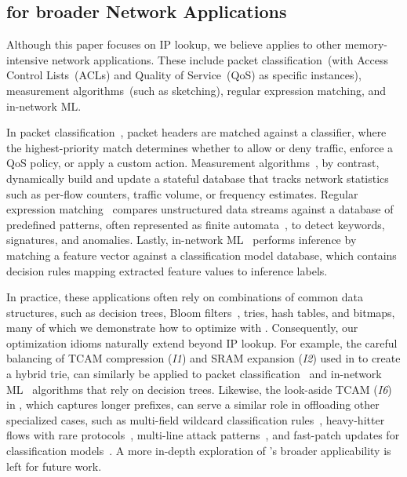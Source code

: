 \subsection{\cram for broader Network Applications}\label{subsec:other_applications}

Although this paper focuses on IP lookup, we believe \cram applies to other memory-intensive network applications. These include packet classification~(with Access Control Lists~(ACLs) and Quality of Service~(QoS) as specific instances), measurement algorithms~(such as sketching), regular expression matching, and in-network ML.


In packet classification~\cite{pkt_class_surv1, pkt_class_surv2, pkt_class_surv3}, packet headers are matched against a classifier, where the highest-priority match determines whether to allow or deny traffic, enforce a QoS policy, or apply a custom action. Measurement algorithms~\cite{opensketch, hashpipe, count_min_sketch, sketch_sampling}, by contrast, dynamically build and update a stateful database that tracks network statistics such as per-flow counters, traffic volume, or frequency estimates. Regular expression matching~\cite{insomnia, estan, hyperscan} compares unstructured data streams against a database of predefined patterns, often represented as finite automata~\cite{p4dfa}, to detect keywords, signatures, and anomalies. Lastly, in-network ML~\cite{homunculus, planter, inml_survey} performs inference by matching a feature vector against a classification model database, which contains decision rules mapping extracted feature values to inference labels.

In practice, these applications often rely on combinations of common data structures, such as decision trees, Bloom filters~\cite{bloom_filters}, tries, hash tables, and bitmaps, many of which we demonstrate how to optimize with \cram. Consequently, our optimization idioms naturally extend beyond IP lookup. For example, the careful balancing of TCAM compression ({\em I1}) and SRAM expansion ({\em I2}) used in \mashup to create a hybrid trie, can similarly be applied to packet classification~\cite{neurocuts, hypercuts} and in-network ML~\cite{mousika, decision_tree_p4} algorithms that rely on decision trees. Likewise, the look-aside TCAM ({\em I6}) in \resail, which captures longer prefixes, can serve a similar role in offloading other specialized cases, such as multi-field wildcard classification rules~\cite{pkt_class_surv1}, heavy-hitter flows with rare protocols~\cite{hashpipe}, multi-line attack patterns~\cite{hyperscan}, and fast-patch updates for classification models~\cite{IIsy}. A more in-depth exploration of \cram's broader applicability is left for future work.


